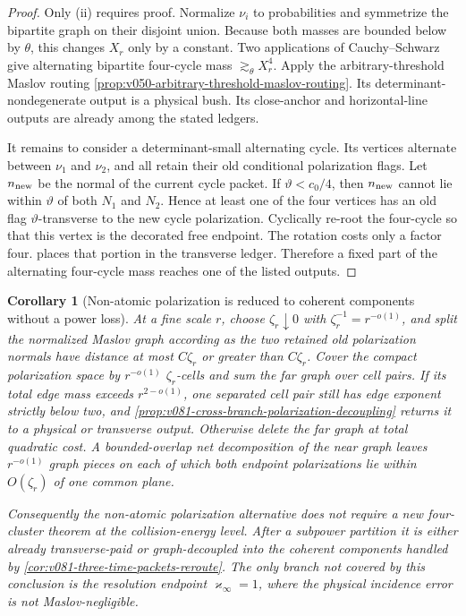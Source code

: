 \documentclass[10pt]{article}
\newtheorem{corollary}[theorem]{Corollary}
\begin{document}
\begin{proof}
Only \textnormal{(ii)} requires proof.  Normalize \(\nu_i\) to probabilities and symmetrize the
bipartite graph on their disjoint union.  Because both masses are bounded below by \(\theta\), this
changes \(X_r\) only by a constant.  Two applications of Cauchy--Schwarz give alternating
bipartite four-cycle mass \(\gtrsim_\theta X_r^4\).  Apply the arbitrary-threshold Maslov routing
\cref{prop:v050-arbitrary-threshold-maslov-routing}.  Its determinant-nondegenerate output is a
physical bush.  Its close-anchor and horizontal-line outputs are already among the stated ledgers.

It remains to consider a determinant-small alternating cycle.  Its vertices alternate between
\(\nu_1\) and \(\nu_2\), and all retain their old conditional polarization flags.  Let
\(n_{\rm new}\) be the normal of the current cycle packet.  If
\(\vartheta<c_0/4\), then \(n_{\rm new}\) cannot lie within \(\vartheta\) of both \(N_1\) and
\(N_2\).  Hence at least one of the four vertices has an old flag
\(\vartheta\)-transverse to the new cycle polarization.  Cyclically re-root the four-cycle so that
this vertex is the decorated free endpoint.  The rotation costs only a factor four.   places that portion in the transverse ledger.
Therefore a fixed part of the alternating four-cycle mass reaches one of the listed outputs.
\end{proof}

\begin{corollary}[Non-atomic polarization is reduced to coherent components without a power loss]
\label{cor:v081-nonatomic-polarization-component-reduction}
At a fine scale \(r\), choose \(\zeta_r\downarrow0\) with
\(\zeta_r^{-1}=r^{-o(1)}\), and split the normalized Maslov graph according as the two retained old
polarization normals have distance at most \(C\zeta_r\) or greater than \(C\zeta_r\).  Cover the
compact polarization space by \(r^{-o(1)}\) \(\zeta_r\)-cells and sum the far graph over cell pairs.
If its total edge mass exceeds \(r^{2-o(1)}\), one separated cell pair still has edge exponent
strictly below two, and
\cref{prop:v081-cross-branch-polarization-decoupling} returns it to a physical or transverse
output.  Otherwise delete the far graph at total quadratic cost.  A bounded-overlap net
decomposition of the near graph leaves \(r^{-o(1)}\) graph pieces on each of which both endpoint
polarizations lie within \(O(\zeta_r)\) of one common plane.

Consequently the non-atomic polarization alternative does not require a new four-cluster theorem
at the collision-energy level.  After a subpower partition it is either already transverse-paid or
graph-decoupled into the coherent components handled by
\cref{cor:v081-three-time-packets-reroute}.  The only branch not covered by this conclusion is the
resolution endpoint \(\varkappa_\infty=1\), where the physical incidence error is not
Maslov-negligible.
\end{corollary}
\end{document}
